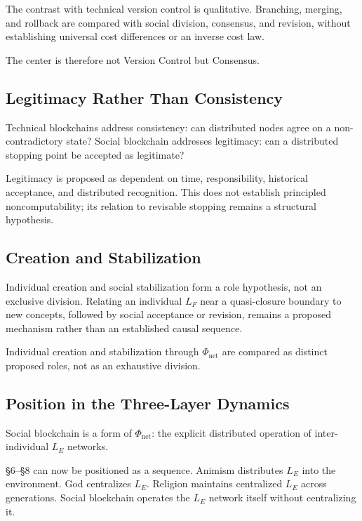 The contrast with technical version control is qualitative. Branching, merging, and rollback are compared with social division, consensus, and revision, without establishing universal cost differences or an inverse cost law.

The center is therefore not Version Control but Consensus.

\subsection{Legitimacy Rather Than Consistency}

Technical blockchains address consistency: can distributed nodes agree on a non-contradictory state? Social blockchain addresses legitimacy: can a distributed stopping point be accepted as legitimate?

Legitimacy is proposed as dependent on time, responsibility, historical acceptance, and distributed recognition. This does not establish principled noncomputability; its relation to revisable stopping remains a structural hypothesis.

\subsection{Creation and Stabilization}

Individual creation and social stabilization form a role hypothesis, not an exclusive division. Relating an individual $L_F$ near a quasi-closure boundary to new concepts, followed by social acceptance or revision, remains a proposed mechanism rather than an established causal sequence.

Individual creation and stabilization through $\Phi_{\text{net}}$ are compared as distinct proposed roles, not as an exhaustive division.

\subsection{Position in the Three-Layer Dynamics}

Social blockchain is a form of $\Phi_{\text{net}}$: the explicit distributed operation of inter-individual $L_E$ networks.

\S{}6--\S{}8 can now be positioned as a sequence. Animism distributes $L_E$ into the environment. God centralizes $L_E$. Religion maintains centralized $L_E$ across generations. Social blockchain operates the $L_E$ network itself without centralizing it.

